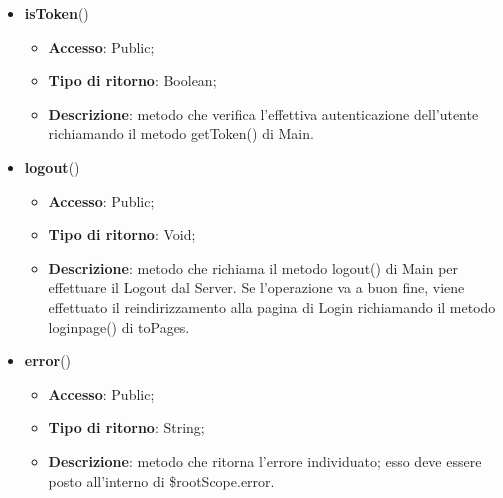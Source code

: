 {\begin{itemize}
\begin{itemize}
			\end{itemize}
			\item \textbf{isToken}()
			\begin{itemize}
				\item \textbf{Accesso}: Public;
				\item \textbf{Tipo di ritorno}: Boolean;
				\item \textbf{Descrizione}: metodo che verifica l'effettiva autenticazione dell'utente richiamando il metodo getToken() di Main.
			\end{itemize}
			\item \textbf{logout}()
			\begin{itemize}
				\item \textbf{Accesso}: Public;
				\item \textbf{Tipo di ritorno}: Void;
				\item \textbf{Descrizione}: metodo che richiama il metodo logout() di Main per effettuare il Logout\ped{g} dal Server. Se l'operazione va a buon fine, viene effettuato il reindirizzamento alla pagina di Login richiamando il metodo loginpage() di toPages.
			\end{itemize}
			\item \textbf{error}()
			\begin{itemize}
				\item \textbf{Accesso}: Public;
				\item \textbf{Tipo di ritorno}: String;
				\item \textbf{Descrizione}: metodo che ritorna l'errore individuato; esso deve essere posto all'interno di \$rootScope.error.
			\end{itemize}
		\end{itemize}

}
